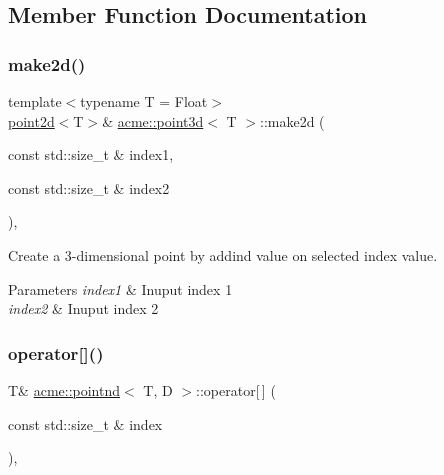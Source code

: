 \subsection{Member Function Documentation}
\mbox{\label{classacme_1_1point3d_a724a96c6ad4aa84b0236a8113d99d4a4}} 
\subsubsection{\texorpdfstring{make2d()}{make2d()}}
{\footnotesize\ttfamily template$<$typename T = Float$>$ \\
\hyperlink{classacme_1_1point2d}{point2d}$<$T$>$\& \hyperlink{classacme_1_1point3d}{acme\+::point3d}$<$ T $>$\+::make2d (\begin{DoxyParamCaption}\item[{const std\+::size\+\_\+t \&}]{index1,  }\item[{const std\+::size\+\_\+t \&}]{index2 }\end{DoxyParamCaption})\hspace{0.3cm}{\ttfamily [inline]}, {\ttfamily [inherited]}}



Create a 3-\/dimensional point by addind value on selected index value. 


\begin{DoxyParams}{Parameters}
{\em index1} & Inuput index 1 \\
\hline
{\em index2} & Inuput index 2 \\
\hline
\end{DoxyParams}
\mbox{\label{classacme_1_1pointnd_a35b0691673728d98d455c007612d6b91}} 
\subsubsection{\texorpdfstring{operator[]()}{operator[]()}\hspace{0.1cm}{\footnotesize\ttfamily [1/2]}}
{\footnotesize\ttfamily T\& \hyperlink{classacme_1_1pointnd}{acme\+::pointnd}$<$ T, D $>$\+::operator\mbox{[}$\,$\mbox{]} (\begin{DoxyParamCaption}\item[{const std\+::size\+\_\+t \&}]{index }\end{DoxyParamCaption})\hspace{0.3cm}{\ttfamily [inline]}, {\ttfamily [inherited]}}



